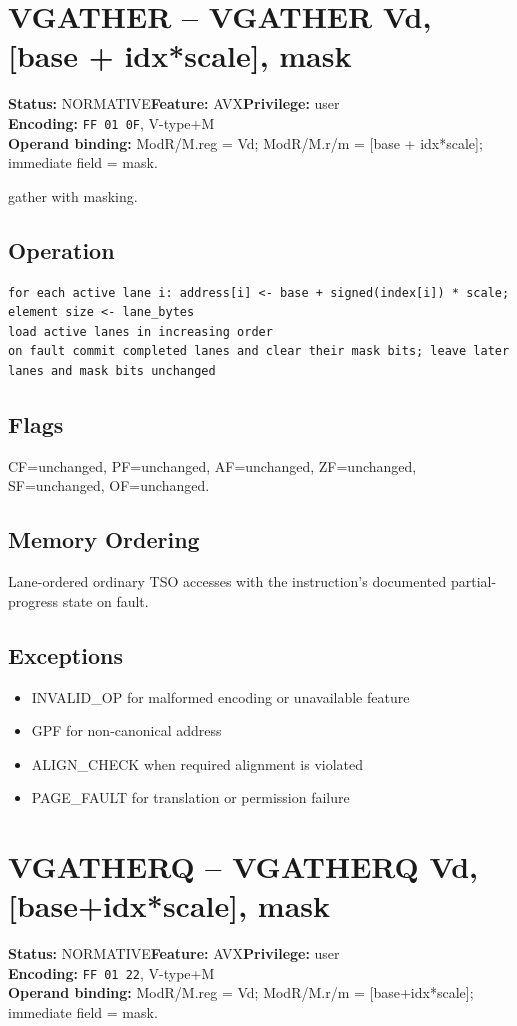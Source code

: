 \documentclass[10pt]{article}
\begin{document}
\section{VGATHER -- VGATHER Vd, [base + idx*scale], mask}
\textbf{Status:} NORMATIVE\quad \textbf{Feature:} AVX\quad \textbf{Privilege:} user\\
\textbf{Encoding:} \texttt{FF 01 0F}, V-type+M\\
\textbf{Operand binding:} ModR/M.reg = Vd; ModR/M.r/m = [base + idx*scale]; immediate field = mask.

gather with masking.

\subsection*{Operation}
\begin{lstlisting}
for each active lane i: address[i] <- base + signed(index[i]) * scale; element size <- lane_bytes
load active lanes in increasing order
on fault commit completed lanes and clear their mask bits; leave later lanes and mask bits unchanged
\end{lstlisting}
\subsection*{Flags}
CF=unchanged, PF=unchanged, AF=unchanged, ZF=unchanged, SF=unchanged, OF=unchanged.
\subsection*{Memory Ordering}
Lane-ordered ordinary TSO accesses with the instruction's documented partial-progress state on fault.
\subsection*{Exceptions}
\begin{itemize}
\item INVALID\_OP for malformed encoding or unavailable feature
\item GPF for non-canonical address
\item ALIGN\_CHECK when required alignment is violated
\item PAGE\_FAULT for translation or permission failure
\end{itemize}
\clearpage

\section{VGATHERQ -- VGATHERQ Vd, [base+idx*scale], mask}
\textbf{Status:} NORMATIVE\quad \textbf{Feature:} AVX\quad \textbf{Privilege:} user\\
\textbf{Encoding:} \texttt{FF 01 22}, V-type+M\\
\textbf{Operand binding:} ModR/M.reg = Vd; ModR/M.r/m = [base+idx*scale]; immediate field = mask.
\end{document}
